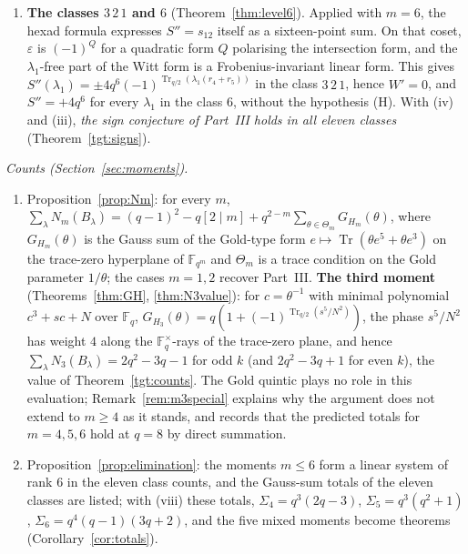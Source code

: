 \documentclass[12pt,a4paper]{amsart}
\theoremstyle{definition}
\newcommand{\F}{\mathbb{F}}
\newcommand{\Tr}{\operatorname{Tr}}
\newcommand{\eps}{\varepsilon}
\newcommand{\Spp}{S''}
\begin{document}
\begin{enumerate}[label=(\roman*),leftmargin=2em]
\item \textbf{The classes $3\,2\,1$ and $6$} (Theorem~\ref{thm:level6}). Applied with $m=6$, the hexad formula expresses $\Spp=s_{12}$ itself as a sixteen-point sum. On that coset, $\eps$ is $(-1)^{Q}$ for a quadratic form $Q$ polarising the intersection form, and the $\lambda_1$-free part of the Witt form is a Frobenius-invariant linear form. This gives $\Spp(\lambda_1)=\pm4q^6(-1)^{\Tr_{q/2}(\lambda_1(r_4+r_5))}$ in the class $3\,2\,1$, hence $W'=0$, and $\Spp=+4q^6$ for every $\lambda_1$ in the class $6$, without the hypothesis (H). With (iv) and (iii), \emph{the sign conjecture of Part~III holds in all eleven classes} (Theorem~\ref{tgt:signs}).
\end{enumerate}

\emph{Counts (Section~\ref{sec:moments}).}
\begin{enumerate}[label=(\roman*),leftmargin=2em,resume]
\item Proposition~\ref{prop:Nm}: for every $m$, $\sum_\lambda N_m(B_\lambda)=(q-1)^2-q[2\mid m]+q^{2-m}\sum_{\theta\in\Theta_m}G_{H_m}(\theta)$, where $G_{H_m}(\theta)$ is the Gauss sum of the Gold-type form $e\mapsto\Tr(\theta e^5+\theta e^3)$ on the trace-zero hyperplane of $\F_{q^m}$ and $\Theta_m$ is a trace condition on the Gold parameter $1/\theta$; the cases $m=1,2$ recover Part~III. \textbf{The third moment} (Theorems~\ref{thm:GH}, \ref{thm:N3value}): for $c=\theta^{-1}$ with minimal polynomial $c^3+sc+N$ over $\F_q$, $G_{H_3}(\theta)=q(1+(-1)^{\Tr_{q/2}(s^5/N^2)})$, the phase $s^5/N^2$ has weight $4$ along the $\F_q^\times$-rays of the trace-zero plane, and hence $\sum_\lambda N_3(B_\lambda)=2q^2-3q-1$ for odd $k$ (and $2q^2-3q+1$ for even $k$), the value of Theorem~\ref{tgt:counts}. The Gold quintic plays no role in this evaluation; Remark~\ref{rem:m3special} explains why the argument does not extend to $m\ge4$ as it stands, and records that the predicted totals for $m=4,5,6$ hold at $q=8$ by direct summation.
\item Proposition~\ref{prop:elimination}: the moments $m\le6$ form a linear system of rank $6$ in the eleven class counts, and the Gauss-sum totals of the eleven classes are listed; with (viii) these totals, $\Sigma_4=q^3(2q-3)$, $\Sigma_5=q^3(q^2+1)$, $\Sigma_6=q^4(q-1)(3q+2)$, and the five mixed moments become theorems (Corollary~\ref{cor:totals}).

\end{enumerate}
\end{document}
